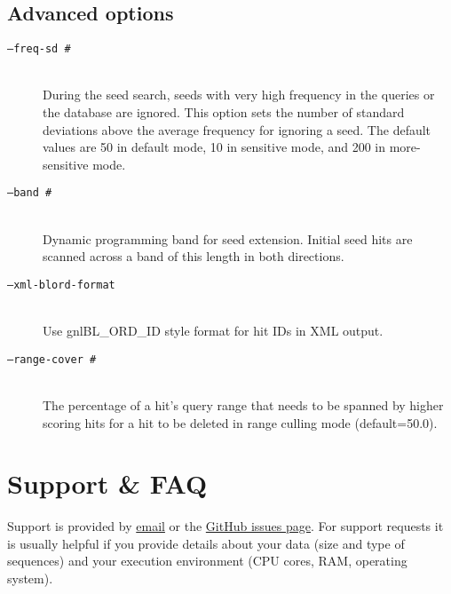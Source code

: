 \documentclass[11pt]{article}
\begin{document}
\subsection{Advanced options}
\begin{description}
\item[\texttt{--freq-sd \#}]\hfill\\
During the seed search, seeds with very high frequency in the queries or the database are ignored. This option sets the number of standard deviations above the average frequency for ignoring a seed. The default values are 50 in default mode, 10 in sensitive mode, and 200 in more-sensitive mode.
\item[\texttt{--band \#}]\hfill\\
Dynamic programming band for seed extension. Initial seed hits are scanned across a band of this length in both directions.
\item[\texttt{--xml-blord-format}]\hfill\\
Use gnl\textbar BL\_ORD\_ID style format for hit IDs in XML output.
\item[\texttt{--range-cover \#}]\hfill\\
The percentage of a hit's query range that needs to be spanned by higher scoring hits for a hit to be deleted in range culling mode (default=50.0).
\end{description}

\section{Support \& FAQ}
Support is provided by \href{mailto:buchfink@gmail.com}{email} or the \href{http://github.com/bbuchfink/diamond/issues/}{GitHub issues page}. For support requests it is usually helpful if you provide details about your data (size and type of sequences) and your execution environment (CPU cores, RAM, operating system).
\end{document}
